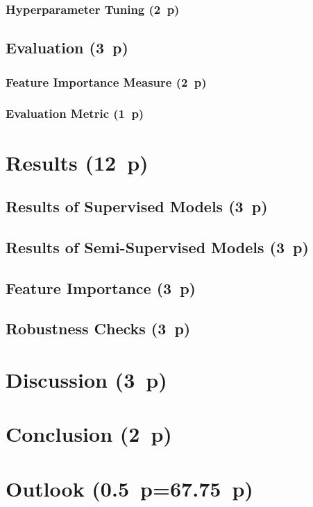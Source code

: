 \subsubsection{Hyperparameter Tuning (2~p)}\label{hyperparameter-tuning}


\subsection{Evaluation (3~p)}\label{evaluation}

\subsubsection{Feature Importance
  Measure (2~p)}\label{feature-importance-measure}

\subsubsection{Evaluation Metric (1~p)}\label{evaluation-metric}

\newpage
\section{Results (12~p)}\label{results}

\subsection{Results of Supervised
  Models (3~p)}\label{results-of-supervised-models}

\subsection{Results of Semi-Supervised
  Models (3~p)}\label{results-of-semi-supervised-models}

\subsection{Feature Importance (3~p)}\label{feature-importance}

\subsection{Robustness Checks (3~p)}\label{robustness-checks}

\newpage
\section{Discussion (3~p)}\label{discussion}

\newpage
\section{Conclusion (2~p)}\label{conclusion}

\newpage
\section{Outlook (0.5~p=67.75~p)}\label{outlook}

